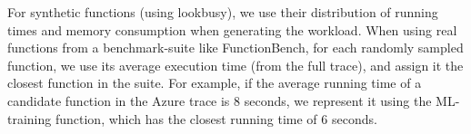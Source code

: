 For synthetic functions (using lookbusy), we use their distribution of running times and memory consumption when generating the workload.
When using real functions from a benchmark-suite like FunctionBench, for each randomly sampled function, we use its average execution time (from the full trace), and assign it the closest function in the suite.
For example, if the average running time of a candidate function in the Azure trace is 8 seconds, we represent it using the ML-training function, which has the closest running time of 6 seconds.






